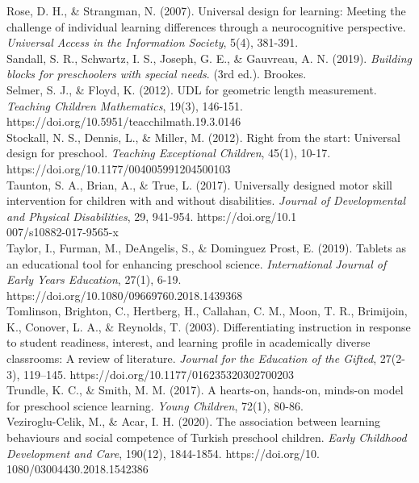 \documentclass[11.5pt]{sig-alternate}
\begin{document}
Rose, D. H., \& Strangman, N. (2007). Universal design for learning: Meeting the challenge of
individual learning differences through a neurocognitive perspective. \textit{Universal Access in
the Information Society}, 5(4), 381-391.
\\

Sandall, S. R., Schwartz, I. S., Joseph, G. E., \& Gauvreau, A. N. (2019). \textit{Building 
blocks for preschoolers with special needs}. (3rd ed.). Brookes.
\\

Selmer, S. J., \& Floyd, K. (2012). UDL for geometric length measurement. \textit{Teaching Children 
Mathematics}, 19(3), 146-151. https://doi.org/10.5951/teacchilmath.19.3.0146 
\\
\newpage
Stockall, N. S., Dennis, L., \& Miller, M. (2012). Right from the start: Universal design for 
preschool. \textit{Teaching Exceptional Children}, 45(1), 10-17. \\https://doi.org/10.1177/004005991204500103 
\\

Taunton, S. A., Brian, A., \& True, L. (2017). Universally designed motor skill intervention for 
children with and without disabilities. \textit{Journal of Developmental and Physical Disabilities}, 29, 941-954. https://doi.org/10.1\\007/s10882-017-9565-x 
\\

Taylor, I., Furman, M., DeAngelis, S., \& Dominguez Prost, E. (2019). Tablets as an educational 
tool for enhancing preschool science. \textit{International Journal of Early Years Education}, 27(1), 6-19. \\https://doi.org/10.1080/09669760.2018.1439368 
\\

Tomlinson, Brighton, C., Hertberg, H., Callahan, C. M., Moon, T. R., Brimijoin, K., Conover, L. 
A., \& Reynolds, T. (2003). Differentiating instruction in response to student readiness, interest, and learning profile in academically diverse classrooms: A review of literature. \textit{Journal for the Education of the Gifted}, 27(2-3), 119–145. https://doi.org/10.1177/016235320302700203
\\

Trundle, K. C., \& Smith, M. M. (2017). A hearts-on, hands-on, minds-on model for preschool 
science learning. \textit{Young Children}, 72(1), 80-86.
\\

Veziroglu-Celik, M., \& Acar, I. H. (2020). The association between learning behaviours and 
social competence of Turkish preschool children. \textit{Early Childhood Development and Care}, 190(12), 1844-1854. https://doi.org/10.\\1080/03004430.2018.1542386 
\\
\end{document}
